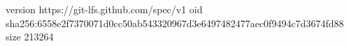 version https://git-lfs.github.com/spec/v1
oid sha256:6558e2f7370071d0cc50ab543320967d3e6497482477aec0f9494c7d3674fd88
size 213264
